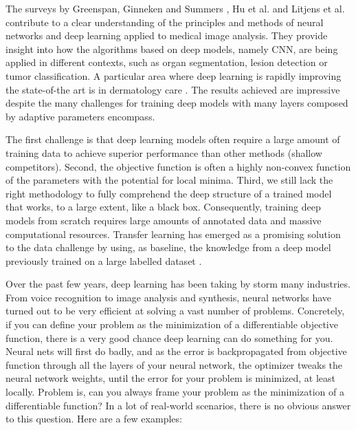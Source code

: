 The surveys by Greenspan, Ginneken and Summers \cite{intro1}, Hu et al. \cite{intro2} and Litjens et al. \cite{intro3} contribute to a clear understanding of the principles and methods of neural networks and deep learning applied to medical image analysis. They provide insight into how the algorithms based on deep models, namely \ac{CNN}, are being applied in different contexts, such as organ segmentation, lesion detection or tumor classification. A particular area where deep learning is rapidly improving the state-of-the art is in dermatology care \cite{nature2017}\cite{intro5}\cite{intro6}. The results achieved are impressive despite the many challenges for training deep models with many layers composed by adaptive parameters encompass.

The first challenge is that deep learning models often require a large amount of training data to achieve superior performance than other methods (shallow competitors). Second, the objective function is often a highly non-convex function of the parameters with the potential for local minima. Third, we still lack the right methodology to fully comprehend the deep structure of a trained model that works, to a large extent, like a black box. Consequently, training deep models from scratch requires large amounts of annotated data and massive computational resources. Transfer learning has emerged as a promising solution to the data challenge by using, as baseline, the knowledge from a deep model previously trained on a large labelled dataset \cite{intro7}\cite{howtransferable}\cite{intro9}.

Over the past few years, deep learning has been taking by storm many industries. From voice recognition to image analysis and synthesis, neural networks have turned out to be very efficient at solving a vast number of problems. Concretely, if you can define your problem as the minimization of a differentiable objective function, there is a very good chance deep learning can do something for you. Neural nets will first do badly, and as the error is backpropagated from objective function through all the layers of your neural network, the optimizer tweaks the neural network weights, until the error for your problem is minimized, at least locally. Problem is, can you always frame your problem as the minimization of a differentiable function? In a lot of real-world scenarios, there is no obvious answer to this question. Here are a few examples:

